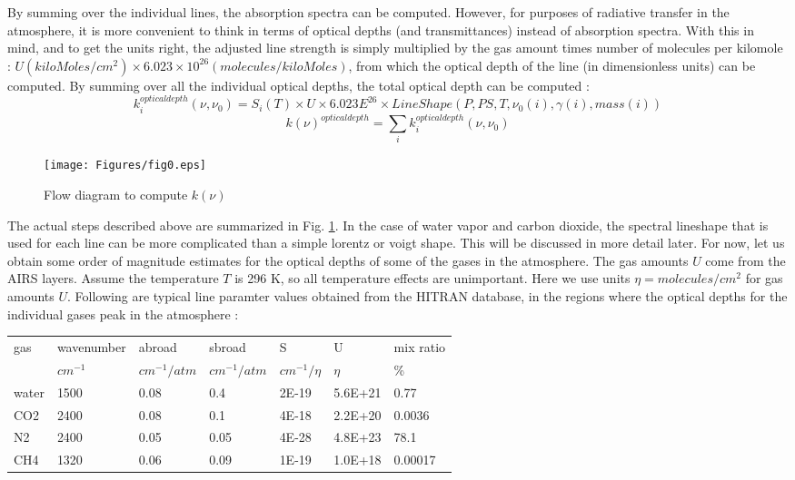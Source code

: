 \documentclass[11pt]{article}
\begin{document}
By summing over the individual lines, the absorption spectra can be 
computed. However, for purposes of radiative transfer in the atmosphere, 
it is more convenient to think in terms of optical depths (and 
transmittances) instead of absorption spectra. With this in mind, and to 
get the units right, the adjusted line strength is simply multiplied by 
the gas amount times number of molecules per kilomole : 
$U (kiloMoles/cm^{2}) \times 6.023 \times 10^{26} (molecules/kiloMoles)$,
from which the optical depth of the line 
(in dimensionless units) can be computed. By summing over all the 
individual optical depths, the total optical depth can be computed : 
\[
k_{i}^{optical depth}(\nu,\nu_{0}) = S_{i}(T) \times U 
\times 6.023E^{26} \times LineShape(P, PS, T, \nu_{0}(i), \gamma(i), mass(i))
\]
\[ 
k(\nu)^{optical depth} = \sum_{i} k_{i}^{optical depth}(\nu,\nu_{0})
\] 

\begin{figure}[h]
  \begin{center}\texttt{[image: Figures/fig0.eps]}\end{center}
  \caption[Computing absorption spectra]{Flow diagram to compute $k(\nu)$}
  \label{fig:easy}
\end{figure}

The actual steps described above are summarized in Fig. \ref{fig:easy}. 
In the case of 
water vapor  and carbon dioxide, the spectral lineshape that is used for 
each line can be more complicated than a simple lorentz or voigt shape. 
This will be discussed in more detail later. For now, let us obtain some 
order of magnitude estimates for the optical depths of some of the gases 
in the atmosphere. The gas amounts $U$ come from the AIRS layers. Assume 
the temperature $T$ is 296 K, so all temperature effects are unimportant.
Here we use units $\eta = molecules/cm^{2}$ for gas amounts $U$. Following
are typical line paramter values obtained from the HITRAN database, in
the regions where the optical depths for the individual gases peak in
the atmosphere : 

\begin{longtable}{lllllll} 
\hline
\hline
gas & wavenumber & abroad         & sbroad       & S & U & mix ratio \\
   & $cm^{-1}$  & $cm^{-1}/atm$ & $cm^{-1}/atm$ &$cm^{-1}/\eta$ & $\eta$ &\%\\ 
\hline
\hline
water & 1500 & 0.08 & 0.4  & 2E-19 & 5.6E+21 & 0.77    \\
CO2   & 2400 & 0.08 & 0.1  & 4E-18 & 2.2E+20 & 0.0036  \\
N2    & 2400 & 0.05 & 0.05 & 4E-28 & 4.8E+23 & 78.1    \\
CH4   & 1320 & 0.06 & 0.09 & 1E-19 & 1.0E+18 & 0.00017 \\
\hline
\hline
\end{longtable} 
\end{document}
